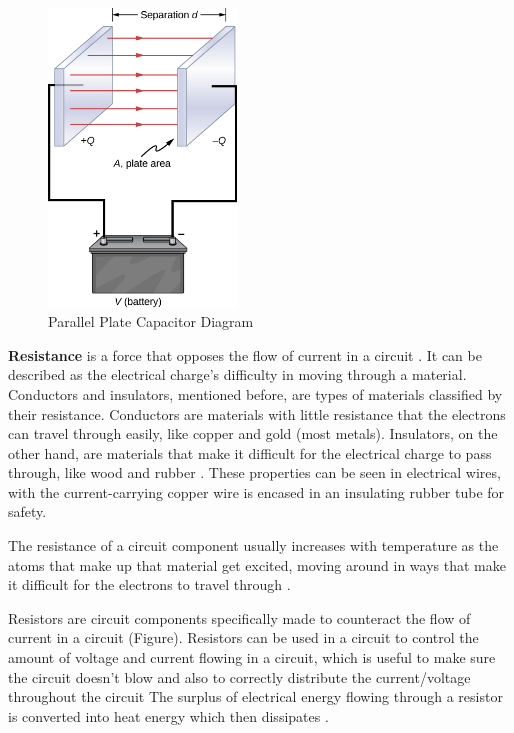 \documentclass[12pt]{article}
\begin{document}
\begin{figure}[ht]
    \centering
    \includegraphics[width=5cm]{parallel plate capacitor.jpg}
    \caption{\centering Parallel Plate Capacitor Diagram \protect\cite{librecapacitance}}
    \label{fig:ppcapacitor}
\end{figure}

\textbf{Resistance} is a force that opposes the flow of current in a circuit
\cite{flukeresistance,hiokiresistance,britresistance}.
It can be described as the electrical charge's difficulty in moving through a material.
\cite{hiokiresistance}
Conductors and insulators, mentioned before, are types of materials classified by their resistance. Conductors are materials with little resistance that the
electrons can travel through easily, like copper and gold (most metals). Insulators, on the other hand, are materials that make it difficult for the electrical
charge to pass through, like wood and rubber
\cite{flukeresistance}.
These properties can be seen in electrical wires, with the current-carrying copper wire is encased in an insulating rubber tube for safety.

The resistance of a circuit component usually increases with temperature as the atoms that make up that material get excited, moving around in ways that make it
difficult for the electrons to travel through
\cite{britresistance,bbcresistance}.

Resistors are circuit components specifically made to counteract the flow of current in a circuit
\cite{britresistor,bbcresistance,hiokiresistance} (Figure).
Resistors can be used in a circuit to control the amount of voltage and current flowing in a circuit, which is useful to make sure the circuit doesn't blow and also
to correctly distribute the current/voltage throughout the circuit
\cite{britresistor,hiokiresistance}
The surplus of electrical energy flowing through a resistor is converted into heat energy which then dissipates
\cite{hiokiresistance}.
\end{document}
